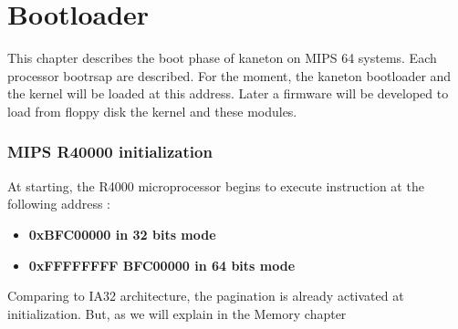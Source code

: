 %
%
%
%
%
%

%
%

\chapter{Bootloader}

This chapter describes the boot phase of kaneton on MIPS 64 systems. Each processor bootrsap are described. For the moment, the kaneton bootloader and the kernel will be loaded at this address. Later a firmware will be developed to load from floppy disk the kernel and these modules.

\subsection{MIPS R40000 initialization}

At starting, the R4000 microprocessor begins to execute instruction at the following address :

\begin{itemize}
  \item
    \textbf{0xBFC00000 in 32 bits mode}
  \item
    \textbf{0xFFFFFFFF BFC00000 in 64 bits mode}
\end{itemize}

Comparing to IA32 architecture, the pagination is already activated at initialization. But, as we will explain in the Memory chapter